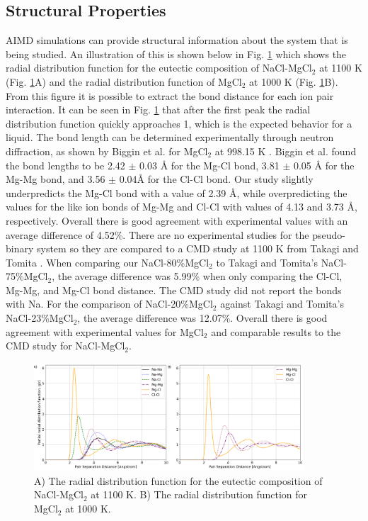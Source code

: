 \documentclass[review]{elsarticle}
\begin{document}
\FloatBarrier

\subsection{Structural Properties}

AIMD simulations can provide structural information about the system that is being studied. An illustration of this is shown below in Fig. \ref{fig:rdf} which shows the radial distribution function for the eutectic composition of NaCl-MgCl$_2$ at 1100 K (Fig. \ref{fig:rdf}A) and the radial distribution function of MgCl$_2$ at 1000 K (Fig. \ref{fig:rdf}B). From this figure it is possible to extract the bond distance for each ion pair interaction. It can be seen in Fig. \ref{fig:rdf} that after the first peak the radial distribution function quickly approaches 1, which is the expected behavior for a liquid. The bond length can be determined experimentally through neutron diffraction, as shown by Biggin et al. for MgCl$_2$ at 998.15 K \cite{biggin1984structures}. Biggin et al. found the bond lengths to be 2.42 $\pm$ 0.03 \r{A} for the Mg-Cl bond, 3.81 $\pm$ 0.05 \r{A} for the Mg-Mg bond, and  3.56 $\pm$ 0.04\r{A} for the Cl-Cl bond. Our study slightly underpredicts the Mg-Cl bond with a value of 2.39 \r{A}, while overpredicting the values for the like ion bonds of Mg-Mg and Cl-Cl with values of 4.13 and 3.73 \r{A}, respectively. Overall there is good agreement with experimental values with an average difference of 4.52\%. There are no experimental studies for the pseudo-binary system so they are compared to a CMD study at 1100 K from Takagi and Tomita \cite{takagi1993structure}. When comparing our NaCl-80\%MgCl$_2$ to Takagi and Tomita's NaCl-75\%MgCl$_2$, the average difference was 5.99\% when only comparing the Cl-Cl, Mg-Mg, and Mg-Cl bond distance. The CMD study did not report the bonds with Na. For the comparison of NaCl-20\%MgCl$_2$ against Takagi and Tomita's NaCl-23\%MgCl$_2$, the average difference was 12.07\%. Overall there is good agreement with experimental values for MgCl$_2$ and comparable results to the CMD study for NaCl-MgCl$_2$.

\begin{figure}[h]
 \centering
 \includegraphics[width=0.9\textwidth]{images/rdf_from_vasppy.png} 
 \caption{A) The radial distribution function for the eutectic composition of NaCl-MgCl$_2$ at 1100 K. B) The radial distribution function for MgCl$_2$ at 1000 K.}
 \label{fig:rdf}
\end{figure} 
\end{document}

